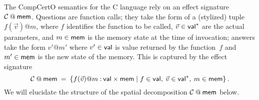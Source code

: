 \begin{example} \label{ex:compcertosig} %

The CompCertO semantics for the C language
rely on an effect signature $\mathcal{C} \mathbin@ \kw{mem}$.
Questions are function calls;
they take the form of a (stylized) tuple $f(\vec{v})@m$, where
$f$ identifies the function to be called,
$\vec{v} \in  \mathsf{val} ^*$ are the actual parameters, and
$m \in  \mathsf{mem} $ is the memory state at the time of invocation;
answers take the form $v'@m'$ where
$v' \in  \mathsf{val} $ is value returned by the function~$f$ and
$m' \in  \mathsf{mem} $ is the new state of the memory.
This is captured by the effect signature
\[
  \mathcal{C} \mathbin@ \kw{mem} \:=\:
  \{ f(\vec{v})@m \mathbin: \kw{val} \times \kw{mem} \mid
     f \in \kw{val}, \:
     \vec{v} \in \kw{val}^*, \:
     m \in \kw{mem} \}
  \,.
\]
We will elucidate the structure of
the spatial decomposition $\mathcal{C} \mathbin@ \kw{mem}$ below.
\end{example}


